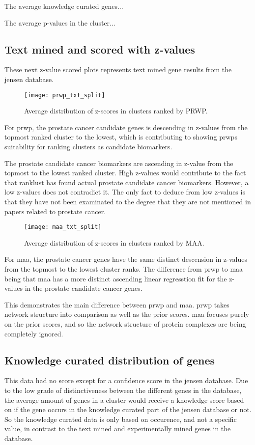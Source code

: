 The average knowledge curated genes...

The average p-values in the cluster...

\subsection{Text mined and scored with z-values}
These next z-value scored plots represents text mined gene results from the
\gls{jensen} database.

\begin{figure}[H]
    \label{fig:txt-iref-prwp}
    \texttt{[image: prwp\_txt\_split]}
    \caption{Average distribution of z-scores in clusters ranked by PRWP.}
\end{figure}
For \gls{prwp}, the prostate cancer candidate genes is descending in z-values
from the topmost ranked cluster to the lowest, which is contributing to
showing \gls{prwp}s suitability for ranking clusters as candidate biomarkers. 

The prostate candidate cancer biomarkers are ascending in z-value from the
topmost to the lowest ranked cluster. High z-values would contribute to the fact
that ranklust has found actual prostate candidate cancer biomarkers. However,
a low z-values does not contradict it. The only fact to deduce from low z-values
is that they have not been examinated to the degree that they are not mentioned
in papers related to prostate cancer.

\begin{figure}[H]
    \label{fig:txt-iref-maa}
    \texttt{[image: maa\_txt\_split]}
    \caption{Average distribution of z-scores in clusters ranked by MAA.}
\end{figure}
For \gls{maa}, the prostate cancer genes have the same distinct descension in
z-values from the topmost to the lowest cluster ranks. The difference from
\gls{prwp} to \gls{maa} being that \gls{maa} has a more distinct ascending
linear regresstion fit for the z-values in the prostate candidate cancer genes.

This demonstrates the main difference between \gls{prwp} and \gls{maa}.
\gls{prwp} takes network structure into comparison as well as the prior scores.
\gls{maa} focuses purely on the prior scores, and so the network structure of
protein complexes are being completely ignored.

\subsection{Knowledge curated distribution of genes}
This data had no score except for a confidence score in the \gls{jensen}
database. Due to the low grade of distinctiveness between the different genes in
the database, the average amount of genes in a cluster would receive a knowledge
score based on if the gene occurs in the knowledge curated part of the
\gls{jensen} database or not. So the knowledge curated data is only based on
occurence, and not a specific value, in contrast to the text mined and
experimentally mined genes in the database.

